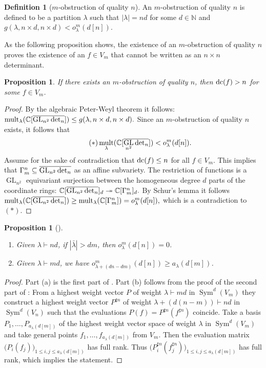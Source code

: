 \documentclass{article}
\numberwithin{equation}{section}
\newtheorem{proposition}[equation]{Proposition}
\theoremstyle{definition}
\newtheorem{definition}[equation]{Definition}
\newcommand{\rightbox}{\hfill\scalebox{0.8}{$\blacksquare$}}
\def\la{\lambda}
\newcommand{\dcorig}{\textup{dc}}
\newcommand{\IC}{\mathbb C}
\DeclareMathOperator{\GL}{GL}
\DeclareMathOperator{\mult}{mult}
\DeclareMathOperator{\Sym}{Sym}
\renewcommand{\det}{\textup{det}}
\begin{document}
\begin{definition}[$m$-obstruction of quality $n$]\label{def:f_obstr}
An $m$-obstruction of quality $n$ is defined to be a partition $\la$ such that $|\lambda|=nd$ for some $d \in \mathbb N$
and
$
g(\la,n\times d, n \times d) < o_{\la}^m(d[n]).
$
\end{definition}

As the following proposition shows, the existence of an $m$-obstruction of quality $n$
proves the existence of an $f\in V_m$ that cannot be written as an $n \times n$ determinant.
\begin{proposition}\label{prop:peter-weyl}
If there exists an $m$-obstruction of quality $n$, then $\dcorig(f) > n$ for some $f \in V_m$.
\end{proposition}
\begin{proof}
By the algebraic Peter-Weyl theorem \cite[eq.~(5.2.7)]{BLMW:11} it follows:
$
\mult_\la (\IC[\overline{\GL_{n^2}\det_n}]) \leq g(\la,n\times d, n \times d).
$
Since an $m$-obstruction of quality $n$ exists, it follows that
\begin{equation*}\tag{$\ast$}
\mult_\la (\IC[\overline{\GL_{n^2}\det_n}]) < o_{\la}^m(d[n]).
\end{equation*}
Assume for the sake of contradiction that $\dcorig(f)\leq n$ for all $f \in V_m$.
This implies that $\Gamma_m^n \subseteq \overline{\GL_{n^2}\det_n}$ as an affine subvariety.
The restriction of functions is a $\GL_{n^2}$ equivariant surjection between the homogeneous degree $d$ parts of the coordinate rings:
$
\IC[\overline{\GL_{n^2}\det_n}]_d \twoheadrightarrow \IC[\Gamma_m^n]_d.
$
By Schur's lemma it follows
$
\mult_\la (\IC[\overline{\GL_{n^2}\det_n}]) \geq \mult_\la(\IC[\Gamma_m^n]) = o_\la^m(d[n]),
$
which is a contradiction to $(\ast)$.
\end{proof}


\begin{proposition}[{\cite{LK:12}}]\label{prop:kadish-landsberg}
\begin{enumerate}
\item[(a)] Given $\la \vdash nd$, if $|\bar\la|>dm$, then $o_\la^m(d[n]) = 0$.
\item[(b)] Given $\la \vdash md$, we have $o_{\la+(dn-dm)}^m(d[n]) \geq a_\la(d[m])$.
\end{enumerate}
\end{proposition}
\begin{proof}
Part (a) is the first part of \cite[Thm 1.3]{LK:12}.
Part (b) follows from the proof of the second part of \cite[Thm 1.3]{LK:12}:
From a highest weight vector $P$ of weight $\la\vdash md$ in $\Sym^d(V_m)$ they construct
a highest weight vector $P^{\sharp n}$ of weight $\la+(d(n-m))\vdash nd$ in $\Sym^d(V_n)$ such that
the evaluations $P(f) = P^{\sharp n}(f^{\sharp n})$ coincide.
Take a basis $P_1,\ldots,P_{a_\la(d[m])}$ of the highest weight vector space of weight $\la$ in $\Sym^d(V_m)$
and take general points $f_1,\ldots,f_{a_\la(d[m])}$ from $V_m$.
Then the evaluation matrix $\big( P_i(f_j) \big)_{1\leq i,j\leq a_\la(d[m])}$ has full rank.
Thus $\big( P^{\sharp n}_i(f^{\sharp n}_j) \big)_{1\leq i,j\leq a_\la(d[m])}$ has full rank,
which implies the statement.
\end{proof}
\end{document}
